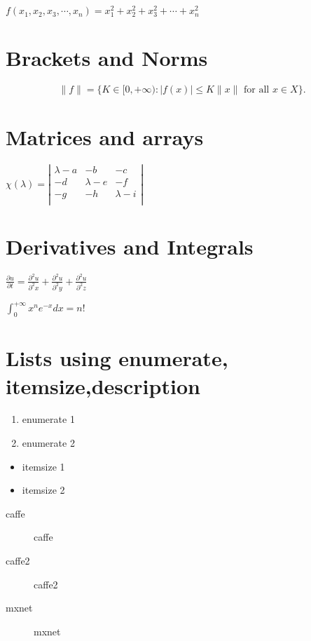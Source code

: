 \documentclass[a4paper,12pt]{article}
\begin{document}
$f(x_1,x_2,x_3,\cdots,x_n) = x_1^2 + x_2^2 + x_3^2 + \cdots + x_n^2$

\section{Brackets and Norms}

\[ \|f\| =  \{ K \in [0,+\infty) : |f(x)| \leq K\|x\| \mbox{ for all } x \in X \}. \] 

\section{Matrices and arrays}

$ \chi(\lambda) = 
\left| 
\begin{array}{ccc}
  \lambda - a  &  -b   & -c  \\ 
  - d          &  \lambda - e   & -f  \\ 
  - g  &  -h   & \lambda - i  \\ 
\end{array} 
\right| 
$

\section{Derivatives and Integrals}
$ 
\frac{\partial u}{\partial t} =
\frac{\partial^2 u}{\partial^2 x} + 
\frac{\partial^2 u}{\partial^2 y} + 
\frac{\partial^2 u}{\partial^2 z}  
$


$
\int_0^{+\infty} x^n  e^{-x} dx = n!
$

\section{Lists using enumerate, itemsize,description}

  \begin{enumerate}
  \item
    enumerate 1
  \item
    enumerate 2
  \end{enumerate}

  \begin{itemize}
  \item
    itemsize 1
  \item
    itemsize 2
  \end{itemize}

  \begin{description}
    \item[caffe]
      caffe
    \item[caffe2]
      caffe2
    \item[mxnet]
      mxnet 
  \end{description}
\end{document}
